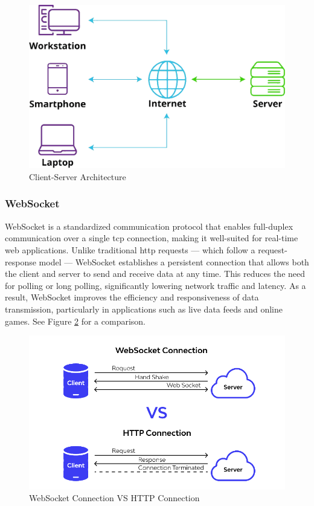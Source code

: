 \begin{figure}[h!]
    \centering
    \includegraphics[width=0.75\linewidth]{figures/theory/client-server-architecture.png}
    \caption[Client-Server Architecture]{Client-Server Architecture \cite{liquidweb:client-server}}
    \label{fig:client-server-architecture}
\end{figure}

\subsubsection*{WebSocket}
\label{subsubsec:websocket}

WebSocket is a standardized communication protocol that enables full-duplex communication over a single \gls{tcp} connection, making it well-suited for real-time web applications. Unlike traditional \gls{http} requests — which follow a request-response model — WebSocket establishes a persistent connection that allows both the client and server to send and receive data at any time. This reduces the need for polling or long polling, significantly lowering network traffic and latency. As a result, WebSocket improves the efficiency and responsiveness of data transmission, particularly in applications such as live data feeds and online games. See Figure \ref{fig:websocket-vs-http} for a comparison. \cite{nodejs:websocket, apidog:websocket}


\begin{figure}[h!]
    \centering
    \includegraphics[width=0.75\linewidth]{figures/theory/websocket-vs-http.png}
    \caption[WebSocket Connection VS HTTP Connection]{WebSocket Connection VS HTTP Connection \cite{apidog:websocket}}
    \label{fig:websocket-vs-http}
\end{figure}

